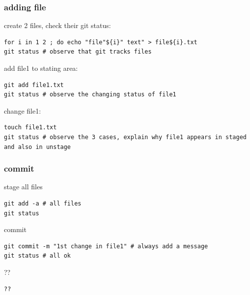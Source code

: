 \begin{frame}[containsverbatim]
\frametitle{ adding file}
\begin{exampleblock}{create 2 files, check their git status:}
\begin{lstlisting}
for i in 1 2 ; do echo "file"${i}" text" > file${i}.txt
git status # observe that git tracks files
\end{lstlisting}
\end{exampleblock}
\begin{exampleblock}{add file1 to stating area:}
\begin{lstlisting}
git add file1.txt
git status # observe the changing status of file1
\end{lstlisting}
\end{exampleblock}
\begin{exampleblock}{change file1:}
\begin{lstlisting}
touch file1.txt
git status # observe the 3 cases, explain why file1 appears in staged and also in unstage
\end{lstlisting}
\end{exampleblock}
\end{frame}
\begin{frame}[containsverbatim]
\frametitle{ commit}
\begin{exampleblock}{stage all files}
\begin{lstlisting}
git add -a # all files
git status
\end{lstlisting}
\end{exampleblock}
\begin{exampleblock}{commit}
\begin{lstlisting}
git commit -m "1st change in file1" # always add a message
git status # all ok
\end{lstlisting}
\end{exampleblock}
\begin{exampleblock}{??}
\begin{lstlisting}
??
\end{lstlisting}
\end{exampleblock}
\end{frame}
